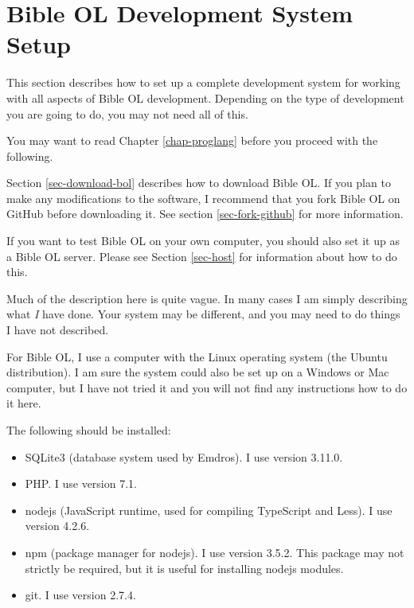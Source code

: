 \documentclass[11pt,oneside,a4paper]{memoir}
\begin{document}
\section{Bible OL Development System Setup}\label{sec-devel}

This section describes how to set up a complete development system for working with all aspects of
Bible OL development. Depending on the type of development you are going to do, you may not need all
of this.

You may want to read Chapter \ref{chap-proglang} before you proceed with the following.

Section \ref{sec-download-bol} describes how to download Bible OL. If you plan to make any
modifications to the software, I recommend that you fork Bible OL on GitHub
before downloading it. See section \ref{sec-fork-github} for more information.

If you want to test Bible OL on your own computer, you should also set it up as a Bible OL server.
Please see Section \ref{sec-host} for information about how to do this.

Much of the description here is quite vague. In many cases I am simply describing what \emph{I} have
done. Your system may be different, and you may need to do things I have not described.

For Bible OL, I use a computer with the Linux operating system (the
Ubuntu distribution). I am sure the system could also be set up on a
Windows or Mac computer, but I have not tried it and you will not find any
instructions how to do it here.

The following should be installed:

\begin{itemize}
\item SQLite3 (database system used by Emdros). I use version 3.11.0.
\item PHP. I use version 7.1.
\item nodejs (JavaScript runtime, used for compiling TypeScript and Less). I use version
  4.2.6.
\item npm (package manager for nodejs). I use version 3.5.2.
  This package may not strictly be required, but it is useful for installing nodejs modules.
\item git. I use version 2.7.4.
\end{itemize}
\end{document}
